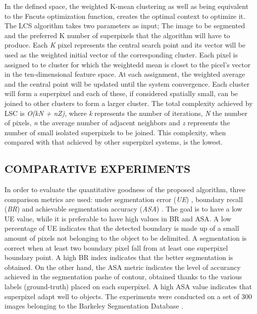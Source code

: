 In the defined space, the weighted K-mean clustering as well as being 
equivalent to the Fncuts optimization function, creates the optimal context to 
optimize it. The LCS algorithm takes two parameters as input; The image 
to be segmented and the preferred K number of superpixels that the 
algorithm will have to produce. Each \emph{K} pixel represents the central search point 
and its vector will be used as the weighted initial vector of the corresponding 
cluster. Each pixel is assigned to te cluster for which the weightedd mean 
is closet to the picel's vector in the ten-dimensional feature space. At each 
assignment, the weighted average and the central point will be updated until 
the system convergence. Each cluster will form a superpixel and each of 
these, if considered spatially small, can be joined to other clusters to form 
a larger cluster. The total complexity achieved by LSC is \emph{O(kN + nZ)}, where 
\emph{k} represents the number of iterations, \emph{N} the number of pixels, \emph{n} the average 
number of adjacent neighbors and \emph{z} represents the number of small 
isolated superpixels to be joined. This complexity, when compared with that 
achieved by other superpixel systems, is the lowest.

\subsection{COMPARATIVE EXPERIMENTS}
In order to evaluate the quantitative goodness of the proposed algorithm, 
three comparison metrics are used: under segmentation error (\emph{UE}) \cite{0781426514}, boundary 
recall (\emph{BR}) and achievable segmentation accuracy (\emph{ASA}) \cite{0781426508}. The 
goal is to have a low UE value, while it is preferable to have high values in BR 
and ASA. A low percentage of UE indicates that the detected boundary is made 
up of a small amount of pixels not belonging to the object to be delimited. 
A segmentation is correct when at least two boundary pixel fall from at least 
one superpixel boundary point. A high BR index indicates that the better 
segmentation is obtained. On the other hand, the ASA metric indicates the 
level of accurancy achieved in the segmentation pashe of contour, obtained 
thanks to the various labels (ground-truth) placed on each superpixel. A 
high ASA value indicates that superpixel adapt well to objects. The experiments 
were conducted on a set of 300 images belonging to the Barkeley 
Segmentation Database \cite{0781426515}.

